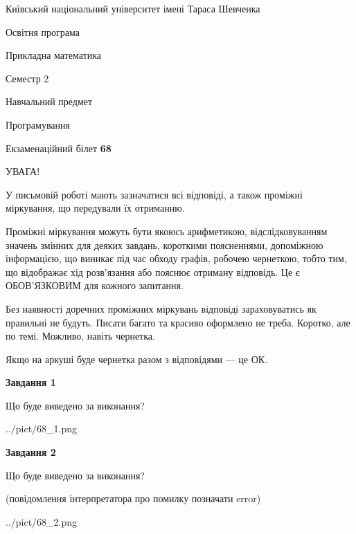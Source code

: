\documentclass[12pt, ukrainian]{article}
\begin{document}
{{\begin {small}\par
{ \center  Київський національний університет імені Тараса Шевченка \par}
{\parbox {5 cm}{Освітня програма \hfill}{\parbox {7 cm}{Прикладна математика\hfill}}\parbox {6 cm}{\hfill Семестр 2}}\par
{\parbox {5 cm} {Навчальний предмет \hfill}\parbox {7 cm}{Програмування \hfill}\parbox {6cm}{\hfill}\par}\vspace{-7pt} \end{small}}{\center Екзаменаційний білет \No \textbf
{ 68 }\par}}
{
\begin {large}
УВАГА!

У письмовій роботі мають зазначатися всі відповіді, а також проміжні міркування, що передували їх отриманню.

Проміжні міркування можуть бути якоюсь арифметикою, відслідковуванням зна\-чень змінних для деяких завдань,
короткими поясненнями, допоміжною інформацією, що виникає під час обходу графів, робочею чернеткою,
тобто тим, що відображає хід розв’язання або пояснює отриману відповідь.
Це є ОБОВ’ЯЗКОВИМ для кожного запитання.

Без наявності доречних проміжних міркувань відповіді зараховуватись як правиль\-ні не будуть.
Писати багато та красиво оформлено не треба. Коротко, але по темі. Можли\-во, навіть чернетка.

Якщо на аркуші буде чернетка разом з відповідями --- це ОК.

\newpage

{\begin {center}\textbf{Завдання 1}\end {center}}\par
Що буде виведено за виконання?\par
\begin{center}
	{../pict/68_1.png}
\end{center}
\newpage

{\begin {center}\textbf{Завдання 2}\end {center}}\par
Що буде виведено за виконання?\par
 (повідомлення інтерпретатора про помилку позначати error)\par
\begin{center}
	{../pict/68_2.png}
\end{center}
\newpage


\end{large}}
\end{document}
